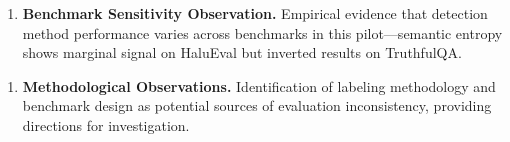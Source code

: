 \begin{enumerate}
\item \textbf{Benchmark Sensitivity Observation.} Empirical evidence that detection method performance varies across benchmarks in this pilot---semantic entropy shows marginal signal on HaluEval but inverted results on TruthfulQA.
\end{enumerate}

\begin{enumerate}
\item \textbf{Methodological Observations.} Identification of labeling methodology and benchmark design as potential sources of evaluation inconsistency, providing directions for investigation.
\end{enumerate}
